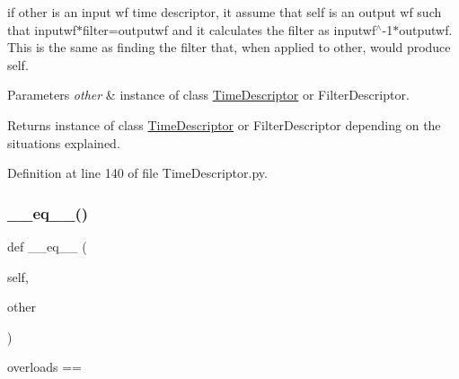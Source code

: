 if other is an input wf time descriptor, it assume that self is an output wf such that inputwf$\ast$filter=outputwf and it calculates the filter as inputwf$^\wedge$-\/1$\ast$outputwf. This is the same as finding the filter that, when applied to other, would produce self.


\begin{DoxyParams}{Parameters}
{\em other} & instance of class \hyperlink{classSignalIntegrity_1_1TimeDomain_1_1Waveform_1_1TimeDescriptor_1_1TimeDescriptor}{Time\+Descriptor} or Filter\+Descriptor. \\
\hline
\end{DoxyParams}
\begin{DoxyReturn}{Returns}
instance of class \hyperlink{classSignalIntegrity_1_1TimeDomain_1_1Waveform_1_1TimeDescriptor_1_1TimeDescriptor}{Time\+Descriptor} or Filter\+Descriptor depending on the situations explained. 
\end{DoxyReturn}


Definition at line 140 of file Time\+Descriptor.\+py.

\mbox{\label{classSignalIntegrity_1_1TimeDomain_1_1Waveform_1_1TimeDescriptor_1_1TimeDescriptor_ad794ff077f2f05f228a7109f3670ac40}} 
\subsubsection{\texorpdfstring{\+\_\+\+\_\+eq\+\_\+\+\_\+()}{\_\_eq\_\_()}}
{\footnotesize\ttfamily def \+\_\+\+\_\+eq\+\_\+\+\_\+ (\begin{DoxyParamCaption}\item[{}]{self,  }\item[{}]{other }\end{DoxyParamCaption})}



overloads == 


